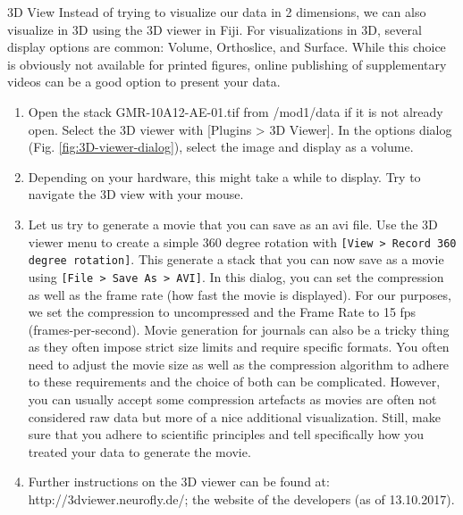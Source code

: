 \newpage
\begin{taskbox}{3D View}
Instead of trying to visualize our data in 2 dimensions, we can also visualize in 3D using the 3D viewer in Fiji. For visualizations in 3D, several display options are common: Volume, Orthoslice, and Surface. While this choice is obviously not available for printed figures, online publishing of supplementary videos can be a good option to present your data.

\begin{enumerate}
	\item Open the stack GMR-10A12-AE-01.tif from /mod1/data if it is not already open. Select the 3D viewer with [Plugins > 3D Viewer]. In the options dialog (Fig. \ref{fig:3D-viewer-dialog}), select the image and display as a volume.	
	
	\begin{minipage}[t]{\linewidth}
		\begin{center}
		\medskip
		\label{fig:3D-viewer-dialog}
		\end{center}
	\end{minipage}
	
	\item Depending on your hardware, this might take a while to display. Try to navigate the 3D view with your mouse. 
	\item Let us try to generate a movie that you can save as an avi file. Use the 3D viewer menu to create a simple 360 degree rotation with \texttt{[View > Record 360 degree rotation]}. This generate a stack that you can now save as a movie using \texttt{[File > Save As > AVI]}. In this dialog, you can set the compression as well as the frame rate (how fast the movie is displayed). For our purposes, we set the compression to uncompressed and the Frame Rate to 15 fps (frames-per-second). Movie generation for journals can also be a tricky thing as they often impose strict size limits and require specific formats. You often need to adjust the movie size as well as the compression algorithm to adhere to these requirements and the choice of both can be complicated. However, you can usually accept some compression artefacts as movies are often not considered raw data but more of a nice additional visualization. Still, make sure that you adhere to scientific principles and tell specifically how you treated your data to generate the movie.
	\item Further instructions on the 3D viewer can be found at: http://3dviewer.neurofly.de/; the website of the developers (as of 13.10.2017).
\end{enumerate}


\end{taskbox}
